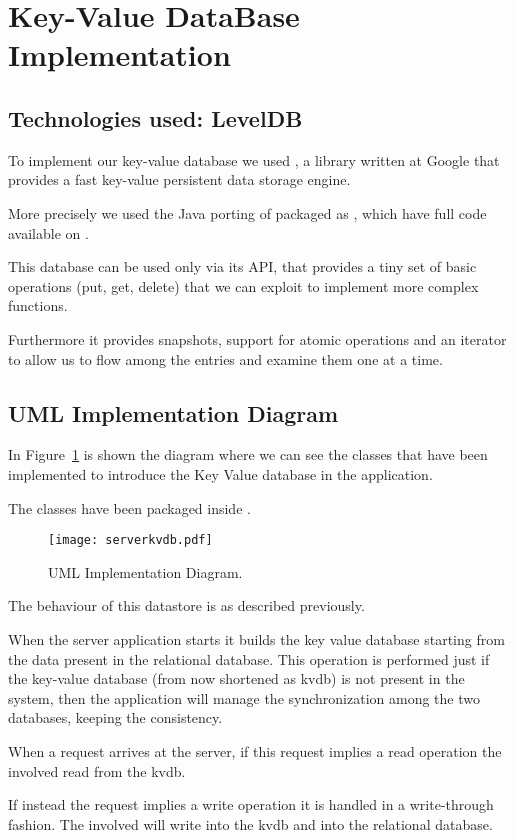 \section{Key-Value DataBase Implementation}

\subsection{Technologies used: LevelDB}

To implement our key-value database we used , a library
written at Google that provides a fast key-value persistent data storage engine.

More precisely we used the Java porting of  packaged as
, which have full code available on .



This database can be used only via its API, that provides a tiny set of basic
operations (put, get, delete) that we can exploit to implement more complex
functions.

Furthermore it provides snapshots, support for atomic operations and
an iterator to allow us to flow among the entries and examine them one at a
time.

\subsection{UML Implementation Diagram}

In Figure~\ref{fig:serverkvdb} is shown the diagram where we can see the classes
that have been implemented to introduce the Key Value database in the
application.

The classes have been packaged inside .

\begin{landscape}
	\begin{figure}
		\texttt{[image: serverkvdb.pdf]}
		\caption{ UML Implementation Diagram.}
		\label{fig:serverkvdb}
	\end{figure}
\end{landscape}

The behaviour of this datastore is as described previously.

When the server application starts it builds the key value database starting
from the data present in the relational database. This operation is performed
just if the key-value database (from now shortened as kvdb) is not present in
the system, then the application will manage the synchronization among the two
databases, keeping the consistency.

When a request arrives at the server, if this request implies a read operation
the  involved read from the kvdb.

If instead the request implies a write operation it is handled in a
write-through fashion. The  involved will write into the
kvdb and into the relational database.
